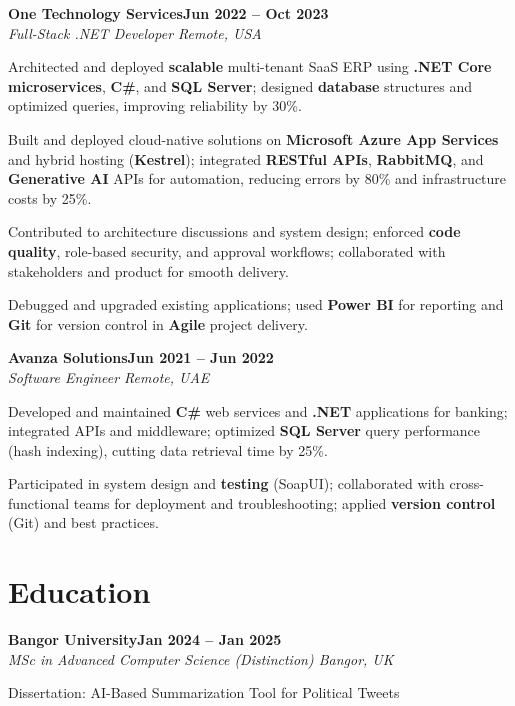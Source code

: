 \documentclass[letterpaper,10pt]{article}
\newcommand{\headingBf}[2]{
  \hspace{10pt}\textbf{#1}\hfill\textbf{#2}\\
}
\newcommand{\headingIt}[2]{
  \hspace{10pt}\textit{#1}\hfill\textit{#2}\\
}
\newenvironment{resume_list}{
  \vspace{-7pt}
  \begin{itemize}[itemsep=-2px, parsep=1pt, leftmargin=30pt]
}{
  \end{itemize}
}
\begin{document}
\headingBf{One Technology Services}{Jun 2022 -- Oct 2023}
\headingIt{Full-Stack .NET Developer \hfill Remote, USA}{}
\begin{resume_list}
    \item Architected and deployed \textbf{scalable} multi-tenant SaaS ERP using \textbf{.NET Core microservices}, \textbf{C\#}, and \textbf{SQL Server}; designed \textbf{database} structures and optimized queries, improving reliability by 30\%.
    \item Built and deployed cloud-native solutions on \textbf{Microsoft Azure App Services} and hybrid hosting (\textbf{Kestrel}); integrated \textbf{RESTful APIs}, \textbf{RabbitMQ}, and \textbf{Generative AI} APIs for automation, reducing errors by 80\% and infrastructure costs by 25\%.
    \item Contributed to architecture discussions and system design; enforced \textbf{code quality}, role-based security, and approval workflows; collaborated with stakeholders and product for smooth delivery.
    \item Debugged and upgraded existing applications; used \textbf{Power BI} for reporting and \textbf{Git} for version control in \textbf{Agile} project delivery.
\end{resume_list}

\headingBf{Avanza Solutions}{Jun 2021 -- Jun 2022}
\headingIt{Software Engineer \hfill Remote, UAE}{}
\begin{resume_list}
    \item Developed and maintained \textbf{C\#} web services and \textbf{.NET} applications for banking; integrated APIs and middleware; optimized \textbf{SQL Server} query performance (hash indexing), cutting data retrieval time by 25\%.
    \item Participated in system design and \textbf{testing} (SoapUI); collaborated with cross-functional teams for deployment and troubleshooting; applied \textbf{version control} (Git) and best practices.
\end{resume_list}

\section{Education}

\headingBf{Bangor University}{Jan 2024 -- Jan 2025}
\headingIt{MSc in Advanced Computer Science (Distinction) \hfill Bangor, UK}{}
\begin{resume_list}
    \item Dissertation: AI-Based Summarization Tool for Political Tweets
\end{resume_list}
\end{document}
